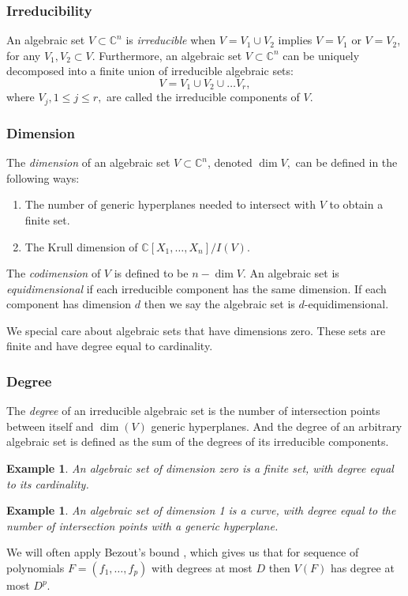 \documentclass[a4paper]{article}
\def\C{\mathbb{C}}
\newtheorem{ex}[theorem]{Example}
\begin{document}
\subsubsection{Irreducibility}
An algebraic set $V \subset \C^n$ is \textit{irreducible} when $V = V_1 \cup V_2$ implies $V=V_1$  or $V=V_2$, for any $V_1,V_2 \subset V$. Furthermore, an algebraic set $V \subset \C^n$ can be uniquely decomposed into a finite union of irreducible algebraic sets:
\[
V = V_1 \cup V_2 \cup \hdots V_r,
\]
where $V_j, 1\leq j \leq r,$ are called the irreducible
components of $V$.
\subsubsection{Dimension}
The \textit{dimension} of an algebraic set $V \subset \C^n$, denoted $\dim V,$ can be defined in the following ways:
\begin{enumerate}
    \item The number of generic hyperplanes needed to intersect with $V$ to obtain a finite set. 
    \item The Krull dimension of $\C[X_1,\hdots,X_n]/I(V)$.
\end{enumerate}
The \textit{codimension} of $V$ is defined to be $n - \dim V$. An algebraic set is \textit{equidimensional} if each irreducible component has the same dimension.  If each component has dimension $d$ then we say the algebraic set is $d$-equidimensional.
\par
We special care about algebraic sets that have dimensions zero. These sets are finite and have degree equal to cardinality.


\subsubsection{Degree}
The \textit{degree} of an irreducible algebraic set is the number of intersection points between itself and $\dim (V)$ generic hyperplanes. And the degree of an arbitrary algebraic set is defined as the sum of the degrees of its irreducible components.
%
\begin{ex}
An algebraic set of dimension zero is a finite set, with degree equal to its cardinality.
\end{ex}
%
\begin{ex}
An algebraic set of dimension 1 is a curve, with degree equal to the number of intersection points with a generic hyperplane.
\end{ex}
%
We will often apply Bezout’s bound \cite{}, which gives us that for sequence of polynomials $F = (f_1,\hdots,f_p)$ with degrees at most $D$ then $V(F)$ has degree at most $D^p$. 
\end{document}
